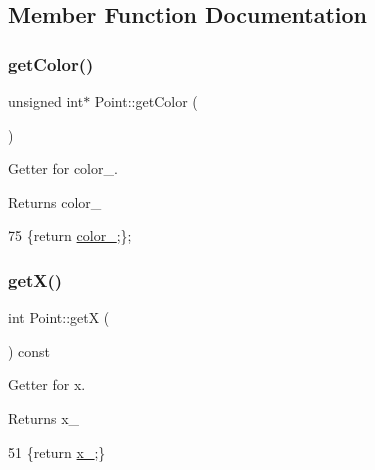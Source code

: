 \subsection{Member Function Documentation}
\mbox{\label{class_point_a1aa902dd929328baec8c8f6970284ac2}} 
\subsubsection{\texorpdfstring{get\+Color()}{getColor()}}
{\footnotesize\ttfamily unsigned int$\ast$ Point\+::get\+Color (\begin{DoxyParamCaption}{ }\end{DoxyParamCaption})\hspace{0.3cm}{\ttfamily [inline]}}



Getter for color\+\_\+. 

\begin{DoxyReturn}{Returns}
color\+\_\+ 
\end{DoxyReturn}

\begin{DoxyCode}
75 \{\textcolor{keywordflow}{return} \mbox{\hyperlink{class_point_af3333647d73989850d2fbf64d14eb9cb}{color\_}};\};
\end{DoxyCode}
\mbox{\label{class_point_ac9d5859db121c7d1b89ca89266dca0a3}} 
\subsubsection{\texorpdfstring{get\+X()}{getX()}}
{\footnotesize\ttfamily int Point\+::getX (\begin{DoxyParamCaption}{ }\end{DoxyParamCaption}) const\hspace{0.3cm}{\ttfamily [inline]}}



Getter for x. 

\begin{DoxyReturn}{Returns}
x\+\_\+ 
\end{DoxyReturn}

\begin{DoxyCode}
51 \{\textcolor{keywordflow}{return} \mbox{\hyperlink{class_point_acfe156c55546f7e551fb54c7ea08a6cb}{x\_}};\}
\end{DoxyCode}
\mbox{\label{class_point_a86d10ff46e08462c45b15a8c7ef62d61}} 

